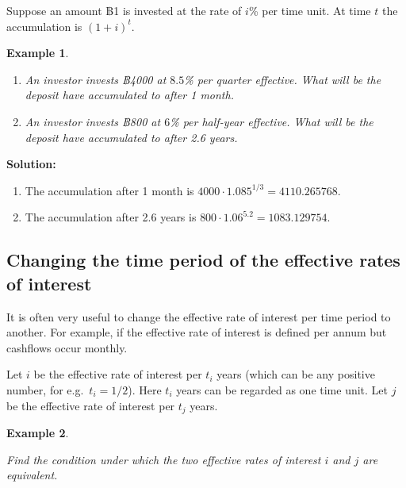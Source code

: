 \documentclass[landscape, 20pt]{extreport}
\theoremstyle{definition}
\theoremstyle{definition}
\newtheorem{example}{Example}[chapter]
\theoremstyle{definition}
\theoremstyle{definition}
\theoremstyle{remark}
\begin{document}
Suppose an amount ฿1 is invested at the rate of \(i\)\% per time unit. At
time \(t\) the accumulation is \((1 + i)^t\).

\newpage \begin{example}
\protect\hypertarget{exm:unlabeled-div-9}{}\label{exm:unlabeled-div-9}

\begin{enumerate}
\def\labelenumi{\arabic{enumi}.}
\item
  \emph{An investor invests ฿4000 at \(8.5\)\% per quarter effective. What
  will be the deposit have accumulated to after 1 month.}
\item
  \emph{An investor invests ฿800 at \(6\)\% per half-year effective. What will
  be the deposit have accumulated to after 2.6 years.}
\end{enumerate}

\end{example}

\textbf{Solution:}

\begin{enumerate}
\def\labelenumi{\arabic{enumi}.}
\item
  The accumulation after 1 month is
  \(4000 \cdot 1.085^{1/3} = 4110.265768.\)
\item
  The accumulation after 2.6 years is
  \(800 \cdot 1.06^{5.2} = 1083.129754.\)
\end{enumerate}

\hypertarget{changing-the-time-period-of-the-effective-rates-of-interest}{%
\subsection{Changing the time period of the effective rates of interest}\label{changing-the-time-period-of-the-effective-rates-of-interest}}

It is often very useful to change the effective rate of interest per
time period to another. For example, if the effective rate of interest
is defined per annum but cashflows occur monthly.

Let \(i\) be the effective rate of interest per \(t_i\) years (which can be
any positive number, for e.g.~\(t_i = 1/2\)). Here \(t_i\) years can be
regarded as one time unit. Let \(j\) be the effective rate of interest per
\(t_j\) years.

\newpage \begin{example}
\protect\hypertarget{exm:unlabeled-div-10}{}\label{exm:unlabeled-div-10}

\emph{Find the condition under which the two effective
rates of interest \(i\) and \(j\) are equivalent.}

\end{example}
\end{document}
